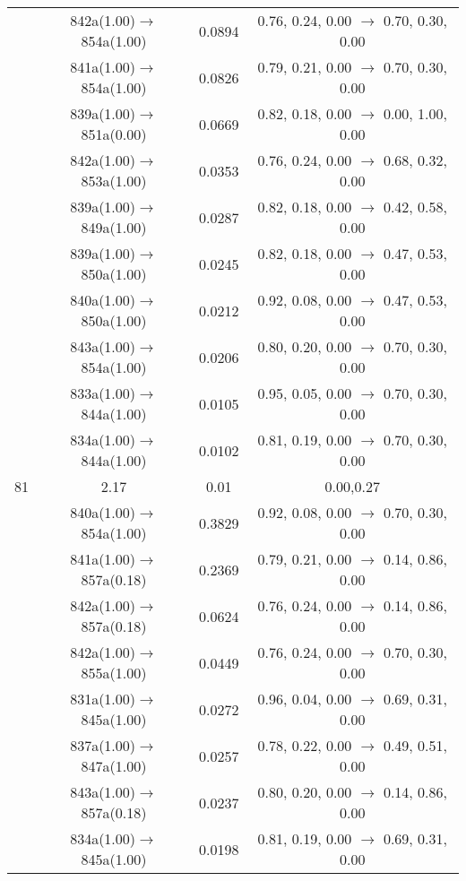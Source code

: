 \documentclass[10pt,a4paper]{article}
\begin{document}
\begin{longtable}{c|c|c|c}
 	& 842a(1.00)$\rightarrow$854a(1.00) &	 0.0894 &	 0.76, 0.24, 0.00 $\rightarrow$ 0.70, 0.30, 0.00 \\ 
 	& 841a(1.00)$\rightarrow$854a(1.00) &	 0.0826 &	 0.79, 0.21, 0.00 $\rightarrow$ 0.70, 0.30, 0.00 \\ 
 	& 839a(1.00)$\rightarrow$851a(0.00) &	 0.0669 &	 0.82, 0.18, 0.00 $\rightarrow$ 0.00, 1.00, 0.00 \\ 
 	& 842a(1.00)$\rightarrow$853a(1.00) &	 0.0353 &	 0.76, 0.24, 0.00 $\rightarrow$ 0.68, 0.32, 0.00 \\ 
 	& 839a(1.00)$\rightarrow$849a(1.00) &	 0.0287 &	 0.82, 0.18, 0.00 $\rightarrow$ 0.42, 0.58, 0.00 \\ 
 	& 839a(1.00)$\rightarrow$850a(1.00) &	 0.0245 &	 0.82, 0.18, 0.00 $\rightarrow$ 0.47, 0.53, 0.00 \\ 
 	& 840a(1.00)$\rightarrow$850a(1.00) &	 0.0212 &	 0.92, 0.08, 0.00 $\rightarrow$ 0.47, 0.53, 0.00 \\ 
 	& 843a(1.00)$\rightarrow$854a(1.00) &	 0.0206 &	 0.80, 0.20, 0.00 $\rightarrow$ 0.70, 0.30, 0.00 \\ 
 	& 833a(1.00)$\rightarrow$844a(1.00) &	 0.0105 &	 0.95, 0.05, 0.00 $\rightarrow$ 0.70, 0.30, 0.00 \\ 
 	& 834a(1.00)$\rightarrow$844a(1.00) &	 0.0102 &	 0.81, 0.19, 0.00 $\rightarrow$ 0.70, 0.30, 0.00 \\ 
 \hline81 &	 2.17 &	 0.01 &	 0.00,0.27 \\ 
  	& 840a(1.00)$\rightarrow$854a(1.00) &	 0.3829 &	 0.92, 0.08, 0.00 $\rightarrow$ 0.70, 0.30, 0.00 \\ 
 	& 841a(1.00)$\rightarrow$857a(0.18) &	 0.2369 &	 0.79, 0.21, 0.00 $\rightarrow$ 0.14, 0.86, 0.00 \\ 
 	& 842a(1.00)$\rightarrow$857a(0.18) &	 0.0624 &	 0.76, 0.24, 0.00 $\rightarrow$ 0.14, 0.86, 0.00 \\ 
 	& 842a(1.00)$\rightarrow$855a(1.00) &	 0.0449 &	 0.76, 0.24, 0.00 $\rightarrow$ 0.70, 0.30, 0.00 \\ 
 	& 831a(1.00)$\rightarrow$845a(1.00) &	 0.0272 &	 0.96, 0.04, 0.00 $\rightarrow$ 0.69, 0.31, 0.00 \\ 
 	& 837a(1.00)$\rightarrow$847a(1.00) &	 0.0257 &	 0.78, 0.22, 0.00 $\rightarrow$ 0.49, 0.51, 0.00 \\ 
 	& 843a(1.00)$\rightarrow$857a(0.18) &	 0.0237 &	 0.80, 0.20, 0.00 $\rightarrow$ 0.14, 0.86, 0.00 \\ 
 	& 834a(1.00)$\rightarrow$845a(1.00) &	 0.0198 &	 0.81, 0.19, 0.00 $\rightarrow$ 0.69, 0.31, 0.00 \\ 

\end{longtable}
\end{document}
